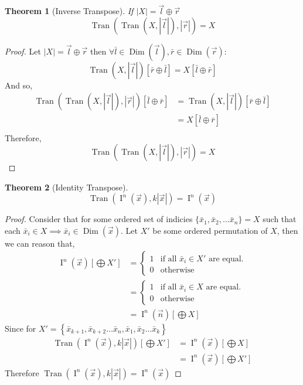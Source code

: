\documentclass[12pt]{article}
\theoremstyle{definition}
\theoremstyle{plain}
\newtheorem{theorem}{Theorem}[section]
\theoremstyle{ppart}
\DeclareMathOperator{\Dim}{Dim}
\DeclareMathOperator{\Ident}{I}
\DeclareMathOperator{\Tran}{Tran}
\begin{document}
\begin{theorem}[Inverse Transpose]
If $|X| = \vec{l} \oplus \vec{r}$
\[ \Tran(\Tran(X, |\vec{l}|), |\vec{r}|) = X \]
\end{theorem}
\begin{proof}
Let $|X| = \vec{l} \oplus \vec{r}$ then
$\forall \bar{l} \in \Dim(\vec{l}), \bar{r} \in \Dim(\vec{r}) : $
\[ \Tran(X, |\vec{l}|)[\bar{r} \oplus \bar{l}] = X[\bar{l} \oplus \bar{r}] \]
And so,
\begin{align*}
	\Tran(\Tran(X, |\vec{l}|), |\vec{r}|)[\bar{l} \oplus \bar{r}]
	&= \Tran(X, |\vec{l}|)[\bar{r} \oplus \bar{l}] \\
	&= X[\bar{l} \oplus \bar{r}] \\
\end{align*}
Therefore, 
\[ \Tran(\Tran(X, |\vec{l}|), |\vec{r}|) = X \]
\end{proof}

\begin{theorem}[Identity Transpose]
\[ \Tran(\Ident^n(\vec{x}), k|\vec{x}|) = \Ident^n(\vec{x}) \]
\end{theorem}
\begin{proof}
Consider that for some ordered set of indicies
$\{\bar{x}_1, \bar{x}_2, \ldots \bar{x}_n\} = X$ such that each
$\bar{x}_i \in X \implies \bar{x}_i \in \Dim(\vec{x})$.
Let $X'$ be some ordered permutation of $X$, then we can reason that,
\begin{align*}
 \Ident^n(\vec{x})\left[\bigoplus X'\right]
 &= 
	\left\{
  \begin{array}{ll}
    1 & \mbox{if all } \bar{x}_i \in X' \mbox{ are equal.}\\
    0 & \mbox{otherwise}
  \end{array}
	\right.\\
 &= 
	\left\{
  \begin{array}{ll}
    1 & \mbox{if all } \bar{x}_i \in X \mbox{ are equal.}\\
    0 & \mbox{otherwise}
  \end{array}
	\right.\\
 &=\Ident^n(\vec{n})\left[\bigoplus X\right]
\end{align*}
Since for
$X' = \left\{\bar{x}_{k+1}, \bar{x}_{k+2} \ldots \bar{x}_{n},
\bar{x}_1, \bar{x}_2 \ldots \bar{x}_k\right\}$
\begin{align*}
  \Tran(\Ident^n(\vec{x}), k|\vec{x}|)\left[\bigoplus X'\right]
	&=
  \Ident^n(\vec{x})\left[\bigoplus X\right]\\
	&=
  \Ident^n(\vec{x})\left[\bigoplus X'\right]
\end{align*}
Therefore
$\Tran(\Ident^n(\vec{x}), k|\vec{x}|) = \Ident^n(\vec{x})$
\end{proof}
\end{document}

